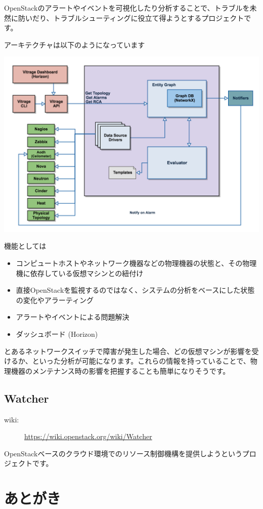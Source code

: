 \documentclass[10pt,b5paper,tombo,openany]{jsbook}
\begin{document}
OpenStackのアラートやイベントを可視化したり分析することで、トラブルを未然に防いだり、トラブルシューティングに役立て得ようとするプロジェクトです。

アーキテクチャは以下のようになっています

\includegraphics[width=\textwidth]{img/Vitrage-high_level_architecture2.png}

機能としては

\begin{itemize}
	\item コンピュートホストやネットワーク機器などの物理機器の状態と、その物理機に依存している仮想マシンとの紐付け
	\item 直接OpenStackを監視するのではなく、システムの分析をベースにした状態の変化やアラーティング
	\item アラートやイベントによる問題解決
	\item ダッシュボード (Horizon)
\end{itemize}

とあるネットワークスイッチで障害が発生した場合、どの仮想マシンが影響を受けるか、といった分析が可能になります。これらの情報を持っていることで、物理機器のメンテナンス時の影響を把握することも簡単になりそうです。

\section{Watcher}
\begin{description}
	\item[wiki:] \url{https://wiki.openstack.org/wiki/Watcher}
\end{description}
OpenStackベースのクラウド環境でのリソース制御機構を提供しようというプロジェクトです。

\chapter{あとがき}
\end{document}
